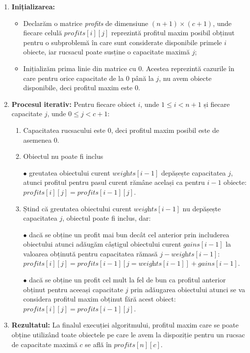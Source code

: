 \begin{sloppypar}
\begin{tcolorbox}[mystyle]
\begin{enumerate}[left=0.2em]
    \item \textbf{Inițializarea:}
    \begin{itemize}
        \item Declarăm o matrice \textit{profits} de dimensiune $ (n + 1) \times (c + 1) $, unde fiecare celulă $ \textit{profits}[i][j] $ reprezintă profitul maxim posibil obținut pentru o subproblemă în care sunt considerate disponibile primele $i$ obiecte, iar rucsacul poate susține o capacitate maximă $j$;
        \item Inițializăm prima linie din matrice cu 0. Acestea reprezintă cazurile în care pentru orice capacitate de la 0 până la $j$, nu avem obiecte disponibile, deci profitul maxim este 0. 
    \end{itemize}
    \item \textbf{Procesul iterativ:}
    Pentru fiecare obiect $i$, unde $1 \le i < n + 1$ și fiecare capacitate $j$, unde $0 \le j < c + 1$:
    \begin{enumerate}
        \item Capacitatea rucsacului este 0, deci profitul maxim posibil este de asemenea 0.
        \item Obiectul nu poate fi inclus \par
            $\bullet$ greutatea obiectului curent $\textit{weights}[i - 1]$ depășește capacitatea $j$, atunci profitul pentru pasul curent rămâne același ca pentru $i - 1$ obiecte: $\textit{profits}[i][j] = \textit{profits}[i - 1][j]$.
        \item Ștind că greutatea obiectului curent $\textit{weights}[i - 1]$ nu depășește capacitatea $j$, obiectul poate fi inclus, dar: \par
        $\bullet$ dacă se obține un profit mai bun decât cel anterior prin includerea obiectului atunci adăugăm câștigul obiectului curent $\textit{gains}[i - 1]$ la valoarea obținută pentru capacitatea rămasă $j - \textit{weights}[i - 1]$: $\textit{profits}[i][j] = \textit{profits}[i - 1][j = \textit{weights}[i - 1]] + \textit{gains}[i - 1]$. \par
        $\bullet$ dacă se obține un profit cel mult la fel de bun ca profitul anterior obținut pentru aceeași capacitate $j$ prin adăugarea obiectului atunci se va considera profitul maxim obținut fără acest obiect: $\textit{profits}[i][j] = \textit{profits}[i - 1][j]$.
    \end{enumerate}
    \item \textbf{Rezultatul:}
    La finalul execuției algoritmului, profitul maxim care se poate obține utilizând toate obiectele pe care le avem la dispoziție pentru un rucsac de capacitate maximă $c$ se află în $\textit{profits}[n][c]$.
\end{enumerate}
\end{tcolorbox}


\end{sloppypar}
